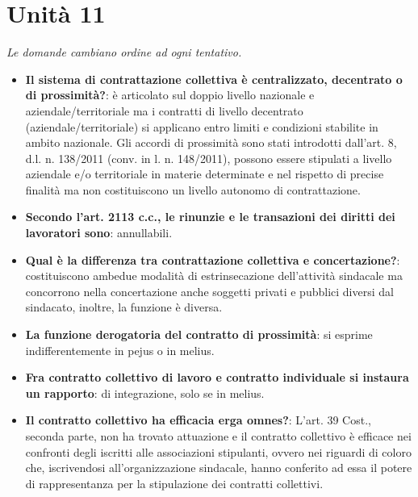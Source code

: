 \documentclass[12pt, a4paper]{report}
\begin{document}
\chapter{Unità 11}
    \textit{Le domande cambiano ordine ad ogni tentativo.}
    \begin{itemize}
        \item \textbf{Il sistema di contrattazione collettiva è centralizzato, decentrato o di prossimità?}: è articolato sul doppio livello nazionale e aziendale/territoriale ma i contratti di livello decentrato (aziendale/territoriale) si applicano entro limiti e condizioni stabilite in ambito nazionale. Gli accordi di prossimità sono stati introdotti dall’art. 8, d.l. n. 138/2011 (conv. in l. n. 148/2011), possono essere stipulati a livello aziendale e/o territoriale in materie determinate e nel rispetto di precise finalità ma non costituiscono un livello autonomo di contrattazione.
        \item \textbf{Secondo l’art. 2113 c.c., le rinunzie e le transazioni dei diritti dei lavoratori sono}: annullabili.
        \item \textbf{Qual è la differenza tra contrattazione collettiva e concertazione?}: costituiscono ambedue modalità di estrinsecazione dell’attività sindacale ma concorrono nella concertazione anche soggetti privati e pubblici diversi dal sindacato, inoltre, la funzione è diversa.
        \item \textbf{La funzione derogatoria del contratto di prossimità}: si esprime indifferentemente in pejus o in melius.
        \item \textbf{Fra contratto collettivo di lavoro e contratto individuale si instaura un rapporto}: di integrazione, solo se in melius.
        \item \textbf{Il contratto collettivo ha efficacia erga omnes?}: L’art. 39 Cost., seconda parte, non ha trovato attuazione e il contratto collettivo è efficace nei confronti degli iscritti alle associazioni stipulanti, ovvero nei riguardi di coloro che, iscrivendosi all’organizzazione sindacale, hanno conferito ad essa il potere di rappresentanza per la stipulazione dei contratti collettivi.
    \end{itemize}
\end{document}

